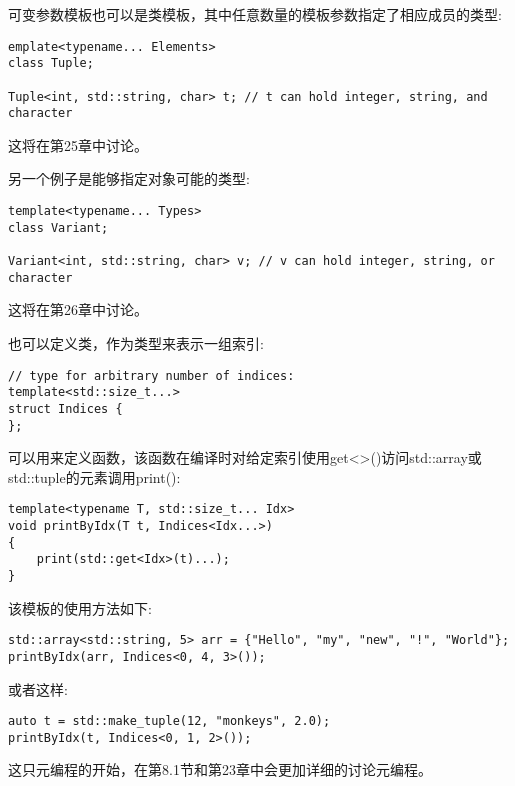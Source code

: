 可变参数模板也可以是类模板，其中任意数量的模板参数指定了相应成员的类型:

\begin{lstlisting}[style=styleCXX]
emplate<typename... Elements>
class Tuple;

Tuple<int, std::string, char> t; // t can hold integer, string, and character
\end{lstlisting}

这将在第25章中讨论。

另一个例子是能够指定对象可能的类型:

\begin{lstlisting}[style=styleCXX]
template<typename... Types>
class Variant;

Variant<int, std::string, char> v; // v can hold integer, string, or character
\end{lstlisting}

这将在第26章中讨论。

也可以定义类，作为类型来表示一组索引:

\begin{lstlisting}[style=styleCXX]
// type for arbitrary number of indices:
template<std::size_t...>
struct Indices {
};
\end{lstlisting}

可以用来定义函数，该函数在编译时对给定索引使用get<>()访问std::array或std::tuple的元素调用print():

\begin{lstlisting}[style=styleCXX]
template<typename T, std::size_t... Idx>
void printByIdx(T t, Indices<Idx...>)
{
	print(std::get<Idx>(t)...);
}
\end{lstlisting}

该模板的使用方法如下:

\begin{lstlisting}[style=styleCXX]
std::array<std::string, 5> arr = {"Hello", "my", "new", "!", "World"};
printByIdx(arr, Indices<0, 4, 3>());
\end{lstlisting}

或者这样:

\begin{lstlisting}[style=styleCXX]
auto t = std::make_tuple(12, "monkeys", 2.0);
printByIdx(t, Indices<0, 1, 2>());
\end{lstlisting}

这只元编程的开始，在第8.1节和第23章中会更加详细的讨论元编程。


